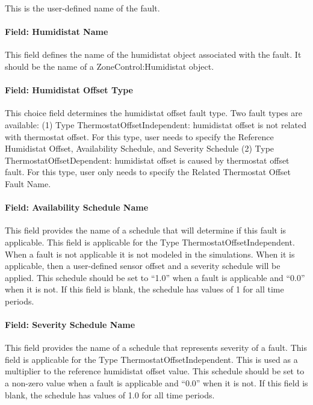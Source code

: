 This is the user-defined name of the fault.

\paragraph{Field: Humidistat Name}\label{field-humidistat-name}

This field defines the name of the humidistat object associated with the fault. It should be the name of a ZoneControl:Humidistat object.

\paragraph{Field: Humidistat Offset Type}\label{field-humidistat-offset-type}

This choice field determines the humidistat offset fault type. Two fault types are available: (1) Type ThermostatOffsetIndependent: humidistat offset is not related with thermostat offset. For this type, user needs to specify the Reference Humidistat Offset, Availability Schedule, and Severity Schedule (2) Type ThermostatOffsetDependent: humidistat offset is caused by thermostat offset fault. For this type, user only needs to specify the Related Thermostat Offset Fault Name.

\paragraph{Field: Availability Schedule Name}\label{field-availability-schedule-name-7-002}

This field provides the name of a schedule that will determine if this fault is applicable. This field is applicable for the Type ThermostatOffsetIndependent. When a fault is not applicable it is not modeled in the simulations. When it is applicable, then a user-defined sensor offset and a severity schedule will be applied. This schedule should be set to ``1.0'' when a fault is applicable and ``0.0'' when it is not. If this field is blank, the schedule has values of 1 for all time periods.

\paragraph{Field: Severity Schedule Name}\label{field-severity-schedule-name-7}

This field provides the name of a schedule that represents severity of a fault. This field is applicable for the Type ThermostatOffsetIndependent. This is used as a multiplier to the reference humidistat offset value. This schedule should be set to a non-zero value when a fault is applicable and ``0.0'' when it is not. If this field is blank, the schedule has values of 1.0 for all time periods.

